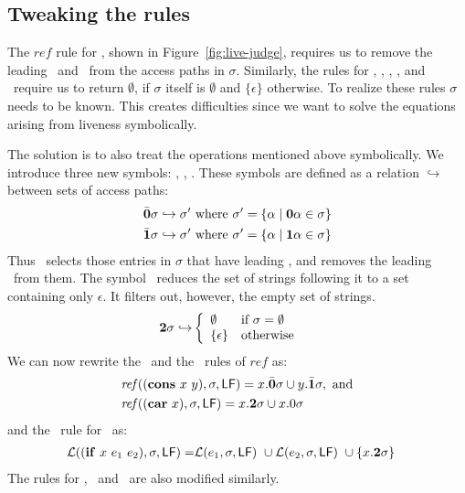 \documentclass[9pt]{sigplanconf}
\begin{document}
\subsection{Tweaking the rules}

The   $\mathit{ref}$   rule   for   \CONS,   shown   in
Figure~\ref{fig:live-judge}, requires us  to remove the
leading  \acar\ and  \acdr\  from the  access paths  in
$\sigma$.  Similarly, the rules  for \CAR, \CDR, \PRIM,
\NULLQ, and \SIF\ require  us to return $\emptyset$, if
$\sigma$      itself       is      $\emptyset$      and
$\lbrace\epsilon\rbrace$  otherwise.  To  realize these
rules  $\sigma$   needs  to  be  known.   This  creates
difficulties  since  we  want to  solve  the  equations
arising from liveness symbolically.

The solution is to  also treat the operations mentioned
above  symbolically.  We  introduce three  new symbols:
\bcar, \bcdr,  \clazy.  These symbols are  defined as a
relation  $\hookrightarrow$  between   sets  of  access
paths:
\begin{align*}
  &\bar{\mathbf{0}}\sigma \hookrightarrow \sigma' \mbox{ where } \sigma' = \{\alpha \mid \mathbf{0}\alpha \in \sigma\}\\
  &\bar{\mathbf{1}}\sigma \hookrightarrow \sigma' \mbox{ where } \sigma' = \{\alpha \mid \mathbf{1}\alpha \in \sigma\}
\end{align*}
Thus \bcar\ selects those entries in $\sigma$ that have leading \acar, and removes the leading \acar\ from them.
The symbol \clazy\ reduces the set of strings following it to a set containing only $\epsilon$. It filters out, however, the empty set of strings.
\begin{align*}
  {\mathbf{2}}\sigma \hookrightarrow & \left\{ 
  \begin{array}{ll}
    \emptyset&\mbox{if}~\sigma = \emptyset\\
    \{\epsilon\} & \mbox{otherwise}
  \end{array}\right.
\end{align*}
We can  now rewrite the \CONS\  and the \CAR\  rules of $\mathit{ref}$
as:
\begin{align*}
&\mathit{ref\/}((\mbox{$\mathbf{cons}$}~x~y),\sigma,\mathsf{LF})
= x.\bar{\mathbf{0}}\sigma \cup y.\bar{\mathbf{1}}\sigma  \label{eqn:mod-cons},~
\mbox{and} \\
&\mathit{ref\/}((\mbox{$\mathbf{car}$}~x),\sigma,\mathsf{LF})
          =   x.{\mathbf{2}}\sigma \cup x.0\sigma
\end{align*}
and the \Lfunonly\ rule
for \SIF\ as:
\begin{align*}
\mathcal{L}((\mbox{$\mathbf{ if}$}~x~e_1~e_2),\sigma,\mathsf{LF}) =
                    &\mathcal{L}(e_1,\sigma,\mathsf{LF})~\cup
        \mathcal{L}(e_2,\sigma,\mathsf{LF})~\cup
          \{x.{\mathbf{2}} \sigma\}
\end{align*}
The rules for  \CDR, \PRIM\ and \NULLQ\ are also
modified similarly.
\end{document}
